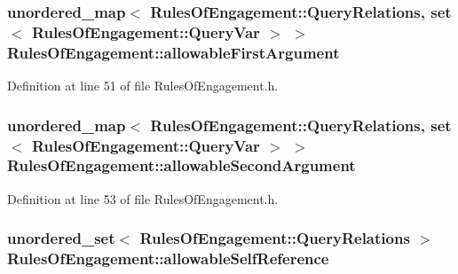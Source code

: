 \hypertarget{class_rules_of_engagement_a0a16b8602e2522f007f54f157a0f1203}{
\subsubsection[{allowable\-First\-Argument}]{\setlength{\rightskip}{0pt plus 5cm}unordered\-\_\-map$<$ {\bf Rules\-Of\-Engagement\-::\-Query\-Relations}, set$<$ {\bf Rules\-Of\-Engagement\-::\-Query\-Var} $>$ $>$ Rules\-Of\-Engagement\-::allowable\-First\-Argument\hspace{0.3cm}{\ttfamily [static]}}}\label{class_rules_of_engagement_a0a16b8602e2522f007f54f157a0f1203}


Definition at line 51 of file Rules\-Of\-Engagement.\-h.

\hypertarget{class_rules_of_engagement_a365f61557120f33a18021667e746f13e}{
\subsubsection[{allowable\-Second\-Argument}]{\setlength{\rightskip}{0pt plus 5cm}unordered\-\_\-map$<$ {\bf Rules\-Of\-Engagement\-::\-Query\-Relations}, set$<$ {\bf Rules\-Of\-Engagement\-::\-Query\-Var} $>$ $>$ Rules\-Of\-Engagement\-::allowable\-Second\-Argument\hspace{0.3cm}{\ttfamily [static]}}}\label{class_rules_of_engagement_a365f61557120f33a18021667e746f13e}


Definition at line 53 of file Rules\-Of\-Engagement.\-h.

\hypertarget{class_rules_of_engagement_a8c7c45f1c886563e1a9e62cd0c22866d}{
\subsubsection[{allowable\-Self\-Reference}]{\setlength{\rightskip}{0pt plus 5cm}unordered\-\_\-set$<$ {\bf Rules\-Of\-Engagement\-::\-Query\-Relations} $>$ Rules\-Of\-Engagement\-::allowable\-Self\-Reference\hspace{0.3cm}{\ttfamily [static]}}}\label{class_rules_of_engagement_a8c7c45f1c886563e1a9e62cd0c22866d}


